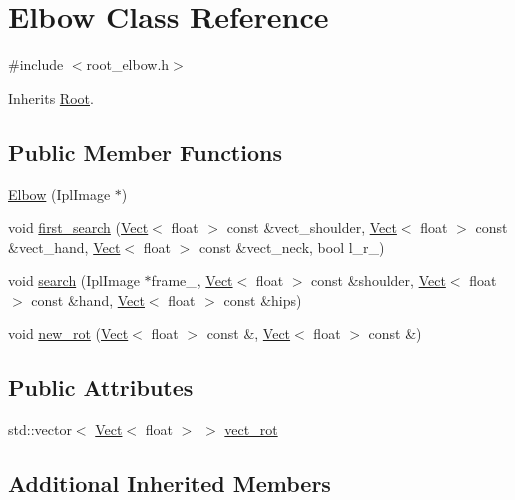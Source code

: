 \hypertarget{class_elbow}{\section{Elbow Class Reference}
\label{class_elbow}
}


{\ttfamily \#include $<$root\+\_\+elbow.\+h$>$}



Inherits \hyperlink{class_root}{Root}.

\subsection*{Public Member Functions}
\begin{DoxyCompactItemize}
\item 
\hyperlink{class_elbow_a59df398e7e27037ea04e2aef590b6c73}{Elbow} (Ipl\+Image $\ast$)
\item 
void \hyperlink{class_elbow_a3be1d6ee905cedcc9f0ec78d8380d581}{first\+\_\+search} (\hyperlink{class_vect}{Vect}$<$ float $>$ const \&vect\+\_\+shoulder, \hyperlink{class_vect}{Vect}$<$ float $>$ const \&vect\+\_\+hand, \hyperlink{class_vect}{Vect}$<$ float $>$ const \&vect\+\_\+neck, bool l\+\_\+r\+\_\+)
\item 
void \hyperlink{class_elbow_a9baba4296500a9ad0e801193c08e721c}{search} (Ipl\+Image $\ast$frame\+\_\+, \hyperlink{class_vect}{Vect}$<$ float $>$ const \&shoulder, \hyperlink{class_vect}{Vect}$<$ float $>$ const \&hand, \hyperlink{class_vect}{Vect}$<$ float $>$ const \&hips)
\item 
void \hyperlink{class_elbow_ae0d447979226a109eb964a9c65681f2e}{new\+\_\+rot} (\hyperlink{class_vect}{Vect}$<$ float $>$ const \&, \hyperlink{class_vect}{Vect}$<$ float $>$ const \&)
\end{DoxyCompactItemize}
\subsection*{Public Attributes}
\begin{DoxyCompactItemize}
\item 
std\+::vector$<$ \hyperlink{class_vect}{Vect}$<$ float $>$ $>$ \hyperlink{class_elbow_ad543686abb59461934cdf1a0b052bcfc}{vect\+\_\+rot}
\end{DoxyCompactItemize}
\subsection*{Additional Inherited Members}


